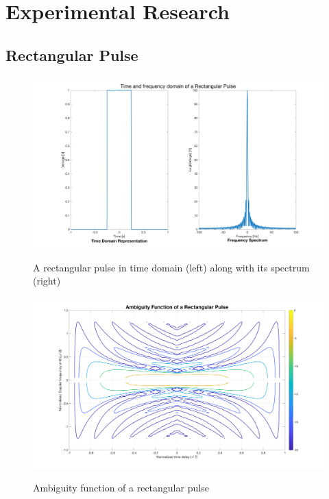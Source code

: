 \chapter*{Experimental Research}

\section*{ Rectangular Pulse } 
 
\begin{figure}[H]
\centering
{\includegraphics[scale=0.18]{usp8_1.png}}
\caption{ A rectangular pulse in time domain (left) along with its spectrum (right)}
\end{figure}

\begin{figure}[H]
\centering
{\includegraphics[scale=0.18]{usp8_4.png}}
\caption{ Ambiguity function of a rectangular pulse }
\end{figure}

